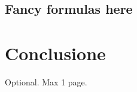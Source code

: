 \documentclass[12pt,a4paper,openright,twoside]{book}
\begin{document}
\section{Fancy formulas here}

\chapter{Conclusione}
\label{chap:conclusione}


\backmatter

\nocite{*} %




\begin{acknowledgements} %
Optional. Max 1 page.
\end{acknowledgements}
\end{document}
